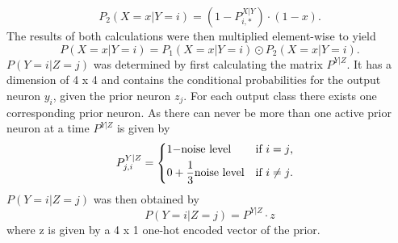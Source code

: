 \begin{equation}
\label{eqn:p2minusXvorausgesetztYMalX}
P_2(X = x|Y = i) = (1 - P^{X|Y}_{i,*}) \cdot (1 - x).
\end{equation}
The results of both calculations were then multiplied element-wise to yield
\begin{equation}
\label{eqn:pXvorausgesetztY}
P(X = x|Y = i) = P_1(X = x|Y = i) \odot P_2(X = x|Y = i).
\end{equation}
$P(Y=i|Z=j)$ was determined by first calculating the matrix $P^{Y|Z}$. It has a dimension of 4 x 4 and contains the conditional probabilities for the output neuron $y_i$, given the prior neuron $z_j$. For each output class there exists one corresponding prior neuron. As there can never be more than one active prior neuron at a time $P^{Y|Z}$ is given by
\begin{equation}
\label{eqn:PYvorausgesetztZIf}
P_{j,i}^{Y|Z} = \begin{dcases*} 1 - $noise level$ & if $i = j$, \\
0 +  \frac{1}{3}  $noise level$ & \text{if $i \neq j$. } \end{dcases*}\end{equation} 
$P(Y=i|Z=j)$ was then obtained by
\begin{equation}
\label{eqn:pYvorausgesetztZ}
P(Y=i|Z=j) = P^{Y|Z} \cdot z
\end{equation}
where z is given by a 4 x 1 one-hot encoded vector of the prior.

